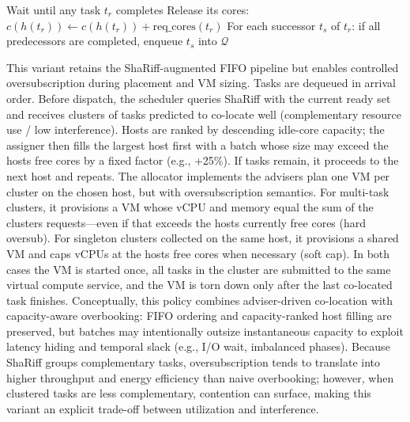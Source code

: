 \begin{algorithm}[H]
{        \BlankLine
        Wait until any task \( t_r \) completes
        Release its cores: \( c(h(t_r)) \gets c(h(t_r)) + \text{req\_cores}(t_r) \)
        For each successor \( t_s \) of \( t_r \): if all predecessors are completed, enqueue \( t_s \) into \( \mathcal{Q} \)
    }
\end{algorithm}

This variant retains the ShaRiff-augmented FIFO pipeline but enables controlled oversubscription during placement and VM sizing. Tasks are dequeued in arrival order. Before dispatch, the scheduler queries ShaRiff with the current ready set and receives clusters of tasks predicted to co-locate well (complementary resource use / low interference). Hosts are ranked by descending idle-core capacity; the assigner then fills the largest host first with a batch whose size may exceed the hosts free cores by a fixed factor (e.g., +25\%). If tasks remain, it proceeds to the next host and repeats.
The allocator implements the advisers plan one VM per cluster on the chosen host, but with oversubscription semantics. For multi-task clusters, it provisions a VM whose vCPU and memory equal the sum of the clusters requests—even if that exceeds the hosts currently free cores (hard oversub). For singleton clusters collected on the same host, it provisions a shared VM and caps vCPUs at the hosts free cores when necessary (soft cap). In both cases the VM is started once, all tasks in the cluster are submitted to the same virtual compute service, and the VM is torn down only after the last co-located task finishes.
Conceptually, this policy combines adviser-driven co-location with capacity-aware overbooking: FIFO ordering and capacity-ranked host filling are preserved, but batches may intentionally outsize instantaneous capacity to exploit latency hiding and temporal slack (e.g., I/O wait, imbalanced phases). Because ShaRiff groups complementary tasks, oversubscription tends to translate into higher throughput and energy efficiency than naive overbooking; however, when clustered tasks are less complementary, contention can surface, making this variant an explicit trade-off between utilization and interference.



